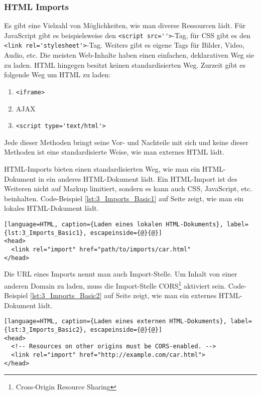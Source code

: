 \subsubsection{HTML Imports}
\label{sec:3_WC_Imports}

Es gibt eine Vielzahl von Möglichkeiten, wie man diverse Ressourcen lädt. Für JavaScript gibt es beispielsweise den \lstinline|<script src=''>|-Tag, für CSS gibt es den \lstinline|<link rel='stylesheet'>|-Tag. Weiters gibt es eigene Tags für Bilder, Video, Audio, etc. Die meisten Web-Inhalte haben einen einfachen, deklarativen Weg sie zu laden. HTML hingegen besitzt keinen standardisierten Weg. Zurzeit gibt es folgende Weg um HTML zu laden:
\begin{enumerate}
\item \lstinline|<iframe>|
\item AJAX
\item \lstinline|<script type='text/html'>|
\end{enumerate}

Jede dieser Methoden bringt seine Vor- und Nachteile mit sich und keine dieser Methoden ist eine standardisierte Weise, wie man externes HTML lädt.

HTML-Imports bieten einen standardisierten Weg, wie man ein HTML-Dokument in ein anderes HTML-Dokument lädt. Ein HTML-Import ist des Weiteren nicht auf Markup limitiert, sondern es kann auch CSS, JavaScript, etc. beinhalten. Code-Beispiel \ref{lst:3_Imports_Basic1} auf Seite \pageref{lst:3_Imports_Basic1} zeigt, wie man ein lokales HTML-Dokument lädt.

\begin{lstlisting}[language=HTML, caption={Laden eines lokalen HTML-Dokuments}, label={lst:3_Imports_Basic1}, escapeinside={@}{@}]
<head>
  <link rel="import" href="path/to/imports/car.html"
</head>
\end{lstlisting}

Die URL eines Imports nennt man auch \glqq Import-Stelle\grqq . Um Inhalt von einer anderen Domain zu laden, muss die Import-Stelle CORS\footnote{Cross-Origin Resource Sharing} aktiviert sein. Code-Beispiel \ref{lst:3_Imports_Basic2} auf Seite \pageref{lst:3_Imports_Basic2} zeigt, wie man ein externes HTML-Dokument lädt.

\begin{lstlisting}[language=HTML, caption={Laden eines externen HTML-Dokuments}, label={lst:3_Imports_Basic2}, escapeinside={@}{@}]
<head>
  <!-- Resources on other origins must be CORS-enabled. -->
  <link rel="import" href="http://example.com/car.html">
</head>
\end{lstlisting}

